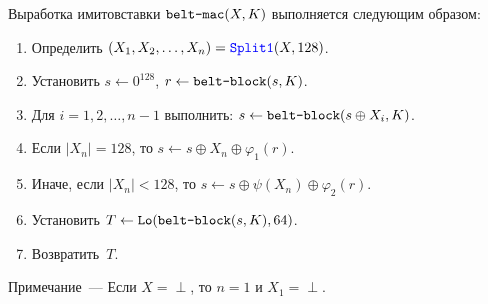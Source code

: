 Выработка имитовставки $\texttt{belt-mac}(X,K)$ выполняется следующим образом:
\begin{enumerate}
\item
Определить $(X_1,X_2,\ldots,X_n)=\mathop{\textcolor{blue}{\texttt{Split1}}}\nolimits(X,128)$.
\item
Установить
$s\leftarrow 0^{128}$, $r\leftarrow \texttt{belt-block}(s,K)$.
\item
Для $i=1,2,\ldots,n-1$ выполнить:
$s\leftarrow \texttt{belt-block}(s\oplus X_i,K)$.
\item
Если $|X_n|=128$, то 
$s\leftarrow s\oplus X_n\oplus \varphi_1(r)$.
\item
Иначе, если $|X_n|<128$, то
$s\leftarrow s\oplus\psi(X_n)\oplus\varphi_2(r)$.
\item
Установить
$T\leftarrow\mathop{\texttt{Lo}}\nolimits(\texttt{belt-block}(s,K), 64)$.
\item
Возвратить~$T$.
\end{enumerate}

\begin{note}
Примечание~--- Если $X=\perp$, то $n=1$ и $X_1=\perp$.
\end{note}
